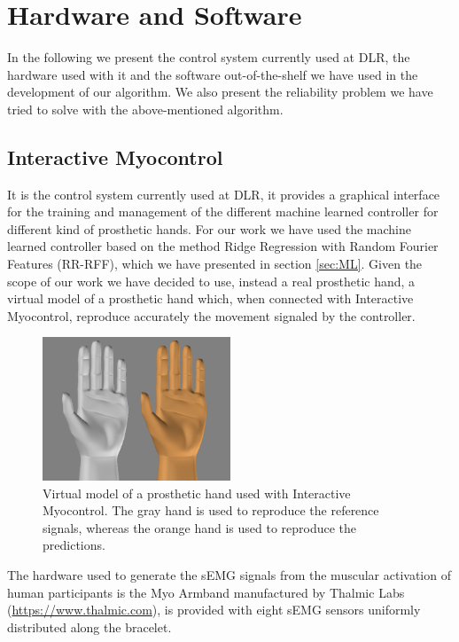 \section{Hardware and Software}\label{sec:H&S}
In the following we present the control system currently used at DLR, the hardware used with it and the software out-of-the-shelf we have used in the development of our algorithm. We also present the reliability problem we have tried to solve with the above-mentioned algorithm. 
\subsection{Interactive Myocontrol}\label{subsec:interactivemyocontrol}
It is the control system currently used at DLR, it provides a graphical interface for the training and management of the different machine learned controller for different kind of prosthetic hands. For our work we have used the machine learned controller based on the method Ridge Regression with Random Fourier Features (RR-RFF), which we have presented in section \ref{sec:ML}. Given the scope of our work we have decided to use, instead a real prosthetic hand, a virtual model of a prosthetic hand which, when connected with Interactive Myocontrol, reproduce accurately the movement signaled by the controller.
\begin{figure}[ht]
    \centering
    \includegraphics[width=0.5\textwidth]{Images/Blender.PNG}
    \caption{Virtual model of a prosthetic hand used with Interactive Myocontrol. The gray hand is used to reproduce the reference signals, whereas the orange hand is used to reproduce the predictions.}
    \label{fig:hand-blender}
\end{figure}
The hardware used to generate the sEMG signals from the muscular activation of human participants is the Myo Armband manufactured by Thalmic Labs (\href{https://www.thalmic.com}{https://www.thalmic.com}), is provided with eight sEMG sensors uniformly distributed along the bracelet.
